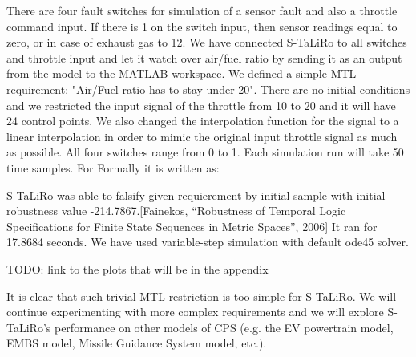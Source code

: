 There are four fault switches for simulation of a sensor fault and also a throttle command input. If there is 1 on the switch input, then sensor readings equal to zero, or in case of  exhaust gas to 12. We have connected S-TaLiRo to all switches and throttle input and let it watch over air/fuel ratio by sending it as an output from the model to the MATLAB workspace. We defined a simple MTL requirement: "Air/Fuel ratio has to stay under 20". There are no initial conditions and we restricted the input signal of the throttle from 10 to 20 and it will have 24 control points. We also changed the interpolation function for the signal to a linear interpolation in order to mimic the original input throttle signal as much as possible. All four switches range from 0 to 1. Each simulation run will take 50 time samples. For Formally it is written as:



S-TaLiRo was able to falsify given requierement by initial sample with initial robustness value -214.7867.[Fainekos, “Robustness of Temporal Logic Specifications for Finite State Sequences in Metric Spaces”, 2006] It ran for 17.8684 seconds. We have used variable-step simulation with default ode45 solver.

TODO: link to the plots that will be in the appendix

It is clear that such trivial MTL restriction is too simple for S-TaLiRo. We will continue experimenting with more complex requirements and we will explore S-TaLiRo's performance on other models of CPS (e.g. the EV powertrain model, EMBS model, Missile Guidance System model, etc.).
